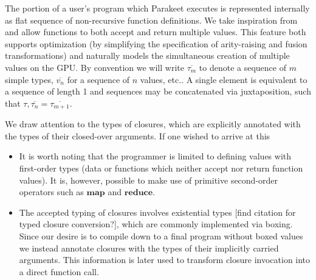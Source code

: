 \documentclass[preprint]{sigplanconf}
\begin{document}
The portion of a user's program which Parakeet executes is represented internally as flat sequence of non-recursive function definitions. 
We take inspiration from \cite{Bol09} and allow functions to both accept and return multiple values. This feature both supports optimization (by simplifying the specification of arity-raising and fusion transformations) and naturally models the simultaneous creation of multiple values on the GPU. By convention we will write $\overline{\tau_m}$ to denote a sequence of $m$ simple types, $\overline{v_n}$ for a sequence  of $n$ values, etc.. A single element is equivalent to a sequence of length 1 and sequences may be concatenated via juxtaposition, such that $\tau, \overline{\tau_n} = \overline{\tau_{m+1}}$. 

We draw attention to the types of closures, which are explicitly annotated with the types of their closed-over arguments. If one wished to arrive at this 
\begin{itemize}
\item It is worth noting that the programmer is limited to defining values with first-order types (data or functions which neither accept nor return function values). It is, however, possible to make use of primitive second-order operators such as $\mathbf{map}$ and $\mathbf{reduce}$. 
\item The accepted typing of closures involves existential types [find citation for typed closure conversion?], which are commonly implemented via boxing. Since our desire is to compile down to a final program without boxed values we instead annotate closures with the types of their implicitly carried arguments. This information is later used to transform closure invocation into a direct function call. 
\end{itemize}
\end{document}
